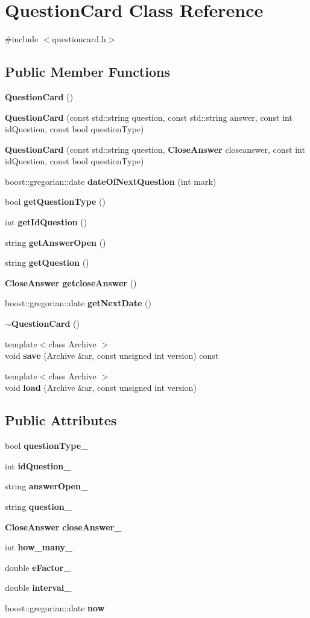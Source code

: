 \section{Question\-Card Class Reference}
\label{class_question_card}


{\ttfamily \#include $<$questioncard.\-h$>$}

\subsection*{Public Member Functions}
\begin{DoxyCompactItemize}
\item 
{\bf Question\-Card} ()
\item 
{\bf Question\-Card} (const std\-::string question, const std\-::string answer, const int id\-Question, const bool question\-Type)
\item 
{\bf Question\-Card} (const std\-::string question, {\bf Close\-Answer} closeanswer, const int id\-Question, const bool question\-Type)
\item 
boost\-::gregorian\-::date {\bf date\-Of\-Next\-Question} (int mark)
\item 
bool {\bf get\-Question\-Type} ()
\item 
int {\bf get\-Id\-Question} ()
\item 
string {\bf get\-Answer\-Open} ()
\item 
string {\bf get\-Question} ()
\item 
{\bf Close\-Answer} {\bf getclose\-Answer} ()
\item 
boost\-::gregorian\-::date {\bf get\-Next\-Date} ()
\item 
{\bf $\sim$\-Question\-Card} ()
\item 
{\footnotesize template$<$class Archive $>$ }\\void {\bf save} (Archive \&ar, const unsigned int version) const 
\item 
{\footnotesize template$<$class Archive $>$ }\\void {\bf load} (Archive \&ar, const unsigned int version)
\end{DoxyCompactItemize}
\subsection*{Public Attributes}
\begin{DoxyCompactItemize}
\item 
bool {\bf question\-Type\-\_\-}
\item 
int {\bf id\-Question\-\_\-}
\item 
string {\bf answer\-Open\-\_\-}
\item 
string {\bf question\-\_\-}
\item 
{\bf Close\-Answer} {\bf close\-Answer\-\_\-}
\item 
int {\bf how\-\_\-many\-\_\-}
\item 
double {\bf e\-Factor\-\_\-}
\item 
double {\bf interval\-\_\-}
\item 
boost\-::gregorian\-::date {\bf now}
\end{DoxyCompactItemize}
